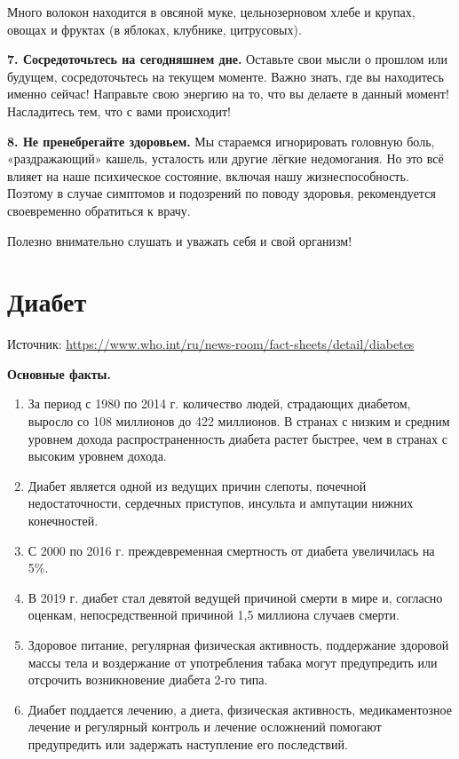 Много волокон находится в овсяной муке, цельнозерновом хлебе и крупах, овощах и фруктах (в яблоках, клубнике, цитрусовых).

\textbf{7. Сосредоточьтесь на сегодняшнем дне.}  Оставьте свои мысли о прошлом или будущем, сосредоточьтесь на текущем моменте. Важно знать, где вы находитесь именно сейчас! Направьте свою энергию на то, что вы делаете в данный момент! Насладитесь тем, что с вами происходит!

\textbf{8. Не пренебрегайте здоровьем.} Мы стараемся игнорировать головную боль, «раздражающий» кашель, усталость или другие лёгкие недомогания. Но это всё влияет на наше психическое состояние, включая нашу жизнеспособность. Поэтому в случае симптомов и подозрений по поводу здоровья, рекомендуется своевременно обратиться к врачу.

Полезно внимательно слушать и уважать себя и свой организм!


\section{Диабет}
Источник: \url{https://www.who.int/ru/news-room/fact-sheets/detail/diabetes}

\textbf{Основные факты.}
\begin{enumerate}
    \item За период с 1980 по 2014 г. количество людей, страдающих диабетом, выросло со 108 миллионов до 422 миллионов. В странах с низким и средним уровнем дохода распространенность диабета растет быстрее, чем в странах с высоким уровнем дохода.
    \item Диабет является одной из ведущих причин слепоты, почечной недостаточности, сердечных приступов, инсульта и ампутации нижних конечностей.
    \item С 2000 по 2016 г. преждевременная смертность от диабета увеличилась на 5\%.
    \item В 2019 г. диабет стал девятой ведущей причиной смерти в мире и, согласно оценкам, непосредственной причиной 1,5 миллиона случаев смерти.
    \item Здоровое питание, регулярная физическая активность, поддержание здоровой массы тела и воздержание от употребления табака могут предупредить или отсрочить возникновение диабета 2-го типа.
    \item Диабет поддается лечению, а диета, физическая активность, медикаментозное лечение и регулярный контроль и лечение осложнений помогают предупредить или задержать наступление его последствий.
\end{enumerate}

